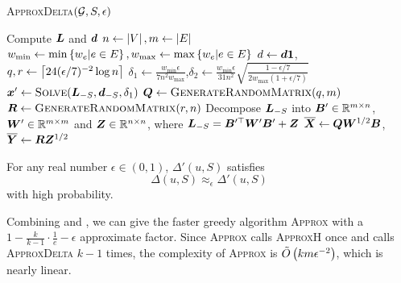 \documentclass[sigconf]{acmart}
\begin{document}
\begin{algorithm}
    \caption{\textsc{ApproxDelta}\((\mathcal{G},S,\epsilon)\)}
    \label{algo:approxdelta}
    Compute \(\boldsymbol{L}\) and \(\boldsymbol{d}\)\;
    \(n\gets\left|V \right|,m\gets\left|E \right|\)\;
    \(w_{\min}\gets\min\left\{w_e|e\in E \right\},w_{\max}\gets\max\left\{w_e|e\in E \right\}\)\;
    \(d\gets\boldsymbol{d}\boldsymbol{1}\),\(q,r\gets\left\lceil24(\epsilon/7)^{-2}\log n\right\rceil\)\;
    \(\delta_1\gets \frac{w_{\min}\epsilon}{7n^2w_{\max}}\),\(\delta_2\gets \frac{w_{\min}\epsilon}{31n^2}\sqrt{\frac{1-\epsilon/7}{2w_{\max}(1+\epsilon/7)}}\)\;
    \(\boldsymbol{x}'\gets\textsc{Solve}(\boldsymbol{L}_{-S},\boldsymbol{d}_{-S},\delta_1)\)\;
    \(\boldsymbol{Q}\gets\textsc{GenerateRandomMatrix}(q,m)\)\;
    \(\boldsymbol{R}\gets\textsc{GenerateRandomMatrix}(r,n)\)\;
    Decompose \(\boldsymbol{L}_{-S}\) into \(\boldsymbol{B}'\in\mathbb{R}^{m\times n}\), \(\boldsymbol{W}'\in\mathbb{R}^{m\times m}\) and \(\boldsymbol{Z}\in\mathbb{R}^{n\times n}\), where \(\boldsymbol{L}_{-S}=\boldsymbol{B}'^\top\boldsymbol{W}'\boldsymbol{B}'+\boldsymbol{Z}\)\;
    \(\overline{\boldsymbol{X}}\gets\boldsymbol{Q}\boldsymbol{W}^{1/2}\boldsymbol{B}\),\(\overline{\boldsymbol{Y}}\gets\boldsymbol{R}\boldsymbol{Z}^{1/2}\)\;

\end{algorithm}

\begin{lemma}\label{lem:approx-marginest}
    For any real number \(\epsilon\in(0,1)\), \(\Delta'(u,S)\) satisfies
    \[\Delta(u,S)\approx_\epsilon \Delta'(u,S)\]
    with high probability.
\end{lemma}


Combining  and , we can give the faster greedy algorithm \textsc{Approx} with a \(1-\frac{k}{k-1}\cdot\frac{1}{e}-\epsilon\) approximate factor.
Since \textsc{Approx} calls \textsc{ApproxH} once and calls \textsc{ApproxDelta} \(k-1\) times, the complexity of \textsc{Approx} is \(\tilde{O}\left( km\epsilon^{-2} \right)\), which is nearly linear.
\end{document}

